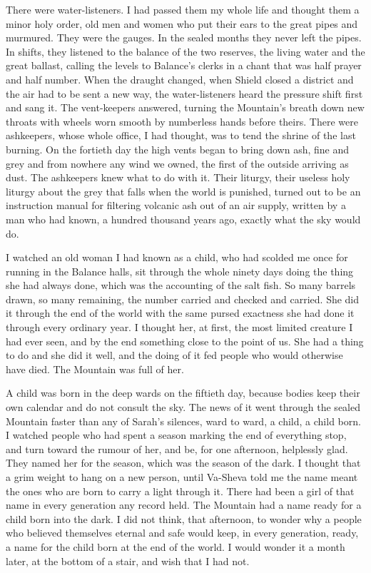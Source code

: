 There were water-listeners. I had passed them my whole life and thought them a minor holy order, old men and women who put their ears to the great pipes and murmured. They were the gauges. In the sealed months they never left the pipes. In shifts, they listened to the balance of the two reserves, the living water and the great ballast, calling the levels to Balance's clerks in a chant that was half prayer and half number. When the draught changed, when Shield closed a district and the air had to be sent a new way, the water-listeners heard the pressure shift first and sang it. The vent-keepers answered, turning the Mountain's breath down new throats with wheels worn smooth by numberless hands before theirs. There were ashkeepers, whose whole office, I had thought, was to tend the shrine of the last burning. On the fortieth day the high vents began to bring down ash, fine and grey and from nowhere any wind we owned, the first of the outside arriving as dust. The ashkeepers knew what to do with it. Their liturgy, their useless holy liturgy about the grey that falls when the world is punished, turned out to be an instruction manual for filtering volcanic ash out of an air supply, written by a man who had known, a hundred thousand years ago, exactly what the sky would do.\par

I watched an old woman I had known as a child, who had scolded me once for running in the Balance halls, sit through the whole ninety days doing the thing she had always done, which was the accounting of the salt fish. So many barrels drawn, so many remaining, the number carried and checked and carried. She did it through the end of the world with the same pursed exactness she had done it through every ordinary year. I thought her, at first, the most limited creature I had ever seen, and by the end something close to the point of us. She had a thing to do and she did it well, and the doing of it fed people who would otherwise have died. The Mountain was full of her.\par

A child was born in the deep wards on the fiftieth day, because bodies keep their own calendar and do not consult the sky. The news of it went through the sealed Mountain faster than any of Sarah's silences, ward to ward, a child, a child born. I watched people who had spent a season marking the end of everything stop, and turn toward the rumour of her, and be, for one afternoon, helplessly glad. They named her for the season, which was the season of the dark. I thought that a grim weight to hang on a new person, until Va-Sheva told me the name meant the ones who are born to carry a light through it. There had been a girl of that name in every generation any record held. The Mountain had a name ready for a child born into the dark. I did not think, that afternoon, to wonder why a people who believed themselves eternal and safe would keep, in every generation, ready, a name for the child born at the end of the world. I would wonder it a month later, at the bottom of a stair, and wish that I had not.\par

